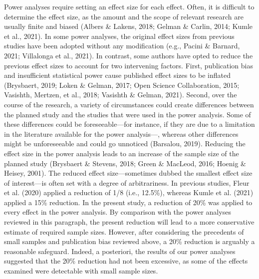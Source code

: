\documentclass[
  12pt,
  man,floatsintext]{apa7}
\begin{document}
Power analyses require setting an effect size for each effect. Often, it is difficult to determine the effect size, as the amount and the scope of relevant research are usually finite and biased (Albers \& Lakens, 2018; Gelman \& Carlin, 2014; Kumle et al., 2021). In some power analyses, the original effect sizes from previous studies have been adopted without any modification (e.g., Pacini \& Barnard, 2021; Villalonga et al., 2021). In contrast, some authors have opted to reduce the previous effect sizes to account for two intervening factors. First, publication bias and insufficient statistical power cause published effect sizes to be inflated (Brysbaert, 2019; Loken \& Gelman, 2017; Open Science Collaboration, 2015; Vasishth, Mertzen, et al., 2018; Vasishth \& Gelman, 2021). Second, over the course of the research, a variety of circumstances could create differences between the planned study and the studies that were used in the power analysis. Some of these differences could be foreseeable---for instance, if they are due to a limitation in the literature available for the power analysis---, whereas other differences might be unforeseeable and could go unnoticed (Barsalou, 2019). Reducing the effect size in the power analysis leads to an increase of the sample size of the planned study (Brysbaert \& Stevens, 2018; Green \& MacLeod, 2016; Hoenig \& Heisey, 2001). The reduced effect size---sometimes dubbed the smallest effect size of interest---is often set with a degree of arbitrariness. In previous studies, Fleur et al. (2020) applied a reduction of 1/8 (i.e., 12.5\%), whereas Kumle et al. (2021) applied a 15\% reduction. In the present study, a reduction of 20\% was applied to every effect in the power analysis. By comparison with the power analyses reviewed in this paragraph, the present reduction will lead to a more conservative estimate of required sample sizes. However, after considering the precedents of small samples and publication bias reviewed above, a 20\% reduction is arguably a reasonable safeguard. Indeed, a posteriori, the results of our power analyses suggested that the 20\% reduction had not been excessive, as some of the effects examined were detectable with small sample sizes.
\end{document}
